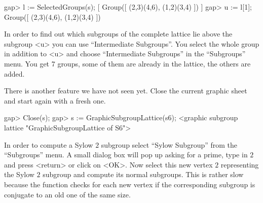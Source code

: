 \begintt
gap> l := SelectedGroups(s);
[ Group([ (2,3)(4,6), (1,2)(3,4) ]) ]
gap> u := l[1];
Group([ (2,3)(4,6), (1,2)(3,4) ])
\endtt

In order  to find out which subgroups  of the complete lattice  lie above
the subgroup <u> you can  use ``Intermediate Subgroups''. You select the
whole group in addition to <u> and choose ``Intermediate Subgroups'' in the 
``Subgroups'' menu. You get 7 groups, some of them are already in the
lattice, the others are added.

There is another feature we have not seen yet.  Close the current graphic
sheet and start again with a fresh one.

\begintt
gap> Close(s);
gap> s := GraphicSubgroupLattice(s6);
<graphic subgroup lattice "GraphicSubgroupLattice of S6">
\endtt

In order to compute a Sylow $2$ subgroup select ``Sylow Subgroup'' from the
``Subgroups'' menu.   A small dialog box  will  pop up asking  for a prime,
type in  $2$ and press <return> or  click on <OK>.   Now select  this new
vertex $2$   representing the Sylow $2$  subgroup  and compute its normal
subgroups.  This is rather slow because the  function checks for each new
vertex if the corresponding  subgroup is conjugate to  an old one  of the
same size.  


%
%
%
%

